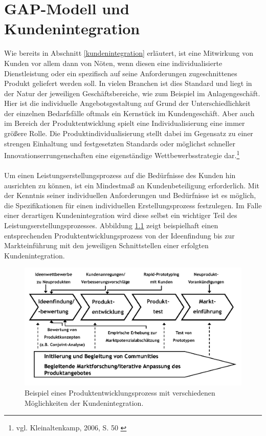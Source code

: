 \chapter{GAP-Modell und Kundenintegration}
\label{kapitel3}
Wie bereits in Abschnitt \ref{kundenintegration} erläutert, ist eine Mitwirkung von Kunden vor allem dann von Nöten, wenn diesen eine individualisierte Dienstleistung oder ein spezifisch auf seine Anforderungen zugeschnittenes Produkt geliefert werden soll. In vielen Branchen ist dies Standard und liegt in der Natur der jeweiligen Geschäftsbereiche, wie zum Beispiel im Anlagengeschäft. Hier ist die individuelle Angebotsgestaltung auf Grund der Unterschiedlichkeit der einzelnen Bedarfsfälle oftmals ein Kernstück im Kundengeschäft. Aber auch im Bereich der Produktentwicklung spielt eine Individualisierung eine immer größere Rolle. Die Produktindividualisierung stellt dabei im Gegensatz zu einer strengen Einhaltung und festgesetzten Standards oder möglichst schneller Innovationserrungenschaften eine eigenständige Wettbewerbsstrategie dar.\footnote{vgl. Kleinaltenkamp, 2006, S. 50 \cite{Kleinaltenkamp2006}}
\\ \\
Um einen Leistungserstellungsprozess auf die Bedürfnisse des Kunden hin ausrichten zu können, ist ein Mindestmaß an Kundenbeteiligung erforderlich. Mit der Kenntnis seiner individuellen Anforderungen und Bedürfnisse ist es möglich, die Spezifikationen für einen individuellen Erstellungsprozess festzulegen. Im Falle einer derartigen Kundenintegration wird diese selbst ein wichtiger Teil des Leistungserstellungsprozesses. Abbildung \ref{produktentwicklung} zeigt beispielhaft einen entsprechenden Produktentwicklungsprozess von der Ideenfindung bis zur Markteinführung mit den jeweiligen Schnittstellen einer erfolgten Kundenintegration.
\begin{figure} [H]
\centering
\includegraphics[width=12cm]{B2B/Bilder/produktentwicklung}
\caption[Produktentwicklungsprozess]{Beispiel eines Produktentwicklungsprozess mit verschiedenen Möglichkeiten der Kundenintegration. \protect\footnotemark}
\label{produktentwicklung}
\end{figure}
